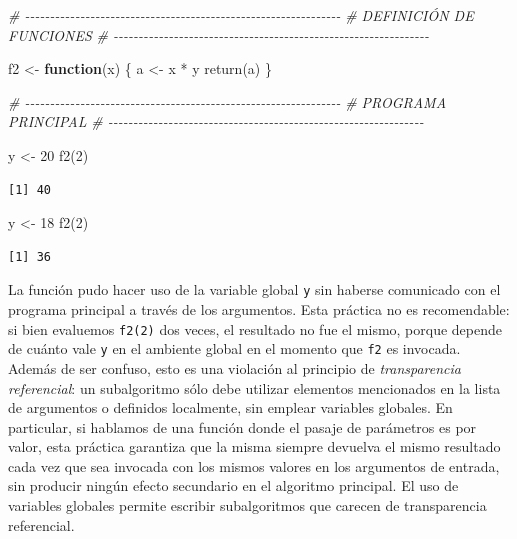 \documentclass[
]{book}
\newenvironment{Shaded}{\begin{snugshade}}{\end{snugshade}}
\newcommand{\CommentTok}[1]{\textcolor[rgb]{0.56,0.35,0.01}{\textit{#1}}}
\newcommand{\ControlFlowTok}[1]{\textcolor[rgb]{0.13,0.29,0.53}{\textbf{#1}}}
\newcommand{\DecValTok}[1]{\textcolor[rgb]{0.00,0.00,0.81}{#1}}
\newcommand{\FunctionTok}[1]{\textcolor[rgb]{0.00,0.00,0.00}{#1}}
\newcommand{\NormalTok}[1]{#1}
\newcommand{\OtherTok}[1]{\textcolor[rgb]{0.56,0.35,0.01}{#1}}
\newcommand{\SpecialCharTok}[1]{\textcolor[rgb]{0.00,0.00,0.00}{#1}}
\begin{document}
\begin{Shaded}
\begin{Highlighting}[]
\CommentTok{\# {-}{-}{-}{-}{-}{-}{-}{-}{-}{-}{-}{-}{-}{-}{-}{-}{-}{-}{-}{-}{-}{-}{-}{-}{-}{-}{-}{-}{-}{-}{-}{-}{-}{-}{-}{-}{-}{-}{-}{-}{-}{-}{-}{-}{-}{-}{-}{-}{-}{-}{-}{-}{-}{-}{-}{-}{-}{-}{-}{-}{-}{-}{-}}
\CommentTok{\# DEFINICIÓN DE FUNCIONES}
\CommentTok{\# {-}{-}{-}{-}{-}{-}{-}{-}{-}{-}{-}{-}{-}{-}{-}{-}{-}{-}{-}{-}{-}{-}{-}{-}{-}{-}{-}{-}{-}{-}{-}{-}{-}{-}{-}{-}{-}{-}{-}{-}{-}{-}{-}{-}{-}{-}{-}{-}{-}{-}{-}{-}{-}{-}{-}{-}{-}{-}{-}{-}{-}{-}{-}}

\NormalTok{f2 }\OtherTok{\textless{}{-}} \ControlFlowTok{function}\NormalTok{(x) \{}
\NormalTok{    a }\OtherTok{\textless{}{-}}\NormalTok{ x }\SpecialCharTok{*}\NormalTok{ y}
    \FunctionTok{return}\NormalTok{(a)}
\NormalTok{\}}

\CommentTok{\# {-}{-}{-}{-}{-}{-}{-}{-}{-}{-}{-}{-}{-}{-}{-}{-}{-}{-}{-}{-}{-}{-}{-}{-}{-}{-}{-}{-}{-}{-}{-}{-}{-}{-}{-}{-}{-}{-}{-}{-}{-}{-}{-}{-}{-}{-}{-}{-}{-}{-}{-}{-}{-}{-}{-}{-}{-}{-}{-}{-}{-}{-}{-}}
\CommentTok{\# PROGRAMA PRINCIPAL}
\CommentTok{\# {-}{-}{-}{-}{-}{-}{-}{-}{-}{-}{-}{-}{-}{-}{-}{-}{-}{-}{-}{-}{-}{-}{-}{-}{-}{-}{-}{-}{-}{-}{-}{-}{-}{-}{-}{-}{-}{-}{-}{-}{-}{-}{-}{-}{-}{-}{-}{-}{-}{-}{-}{-}{-}{-}{-}{-}{-}{-}{-}{-}{-}{-}{-}}

\NormalTok{y }\OtherTok{\textless{}{-}} \DecValTok{20}
\FunctionTok{f2}\NormalTok{(}\DecValTok{2}\NormalTok{)}
\end{Highlighting}
\end{Shaded}

\begin{verbatim}
[1] 40
\end{verbatim}

\begin{Shaded}
\begin{Highlighting}[]
\NormalTok{y }\OtherTok{\textless{}{-}} \DecValTok{18}
\FunctionTok{f2}\NormalTok{(}\DecValTok{2}\NormalTok{)}
\end{Highlighting}
\end{Shaded}

\begin{verbatim}
[1] 36
\end{verbatim}

La función pudo hacer uso de la variable global \texttt{y} sin haberse comunicado con el programa principal a través de los argumentos. Esta práctica no es recomendable: si bien evaluemos \texttt{f2(2)} dos veces, el resultado no fue el mismo, porque depende de cuánto vale \texttt{y} en el ambiente global en el momento que \texttt{f2} es invocada. Además de ser confuso, esto es una violación al principio de \emph{transparencia referencial}: un subalgoritmo sólo debe utilizar elementos mencionados en la lista de argumentos o definidos localmente, sin emplear variables globales. En particular, si hablamos de una función donde el pasaje de parámetros es por valor, esta práctica garantiza que la misma siempre devuelva el mismo resultado cada vez que sea invocada con los mismos valores en los argumentos de entrada, sin producir ningún efecto secundario en el algoritmo principal. El uso de variables globales permite escribir subalgoritmos que carecen de transparencia referencial.
\end{document}
